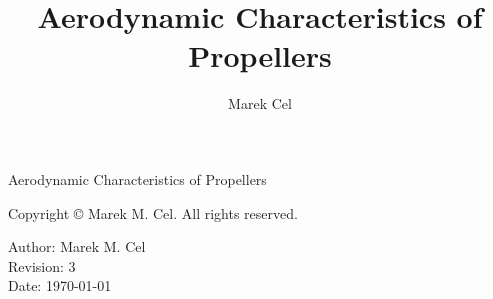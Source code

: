 \documentclass[12pt,a4paper]{report}
\title{Aerodynamic Characteristics of Propellers}
\author{Marek Cel}
\date{}
\begin{document}
  
  \begin{titlepage}
    \centering
    {\huge Aerodynamic Characteristics of Propellers \par}
  \end{titlepage}
  

  \noindent Copyright \copyright{} \the\year{} Marek M. Cel. All rights reserved.

  \noindent Author: Marek M. Cel \\
  Revision: 3 \\
  Date: \today

  
  
  {
    \clearpage
    \setlength{\parskip}{0em}
    \tableofcontents
  }

  
  
  
  \clearpage
   
  
  
\end{document}
